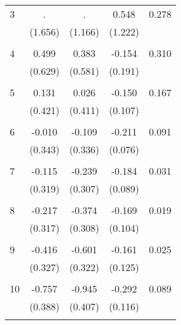 \begin{tabular}{l*{1}{cccc}}
\hline\hline
\hline
   3       &     . &     . & 0.548 & 0.278 \\
          & (1.656) & (1.166) & (1.222) & \\
 & & & &\\
   4       & 0.499 & 0.383 & -0.154 & 0.310 \\
          & (0.629) & (0.581) & (0.191) & \\
 & & & &\\
   5       & 0.131 & 0.026 & -0.150 & 0.167 \\
          & (0.421) & (0.411) & (0.107) & \\
 & & & &\\
   6       & -0.010 & -0.109 & -0.211 & 0.091 \\
          & (0.343) & (0.336) & (0.076) & \\
 & & & &\\
   7       & -0.115 & -0.239 & -0.184 & 0.031 \\
          & (0.319) & (0.307) & (0.089) & \\
 & & & &\\
   8       & -0.217 & -0.374 & -0.169 & 0.019 \\
          & (0.317) & (0.308) & (0.104) & \\
 & & & &\\
   9       & -0.416 & -0.601 & -0.161 & 0.025 \\
          & (0.327) & (0.322) & (0.125) & \\
 & & & &\\
  10       & -0.757 & -0.945 & -0.292 & 0.089 \\
          & (0.388) & (0.407) & (0.116) & \\
 & & & &\\
\hline\hline
\end{tabular}
